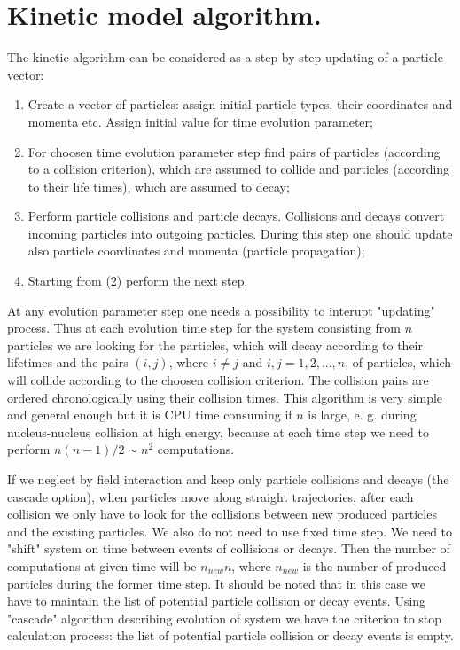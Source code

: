 \section{Kinetic model algorithm.}

 The kinetic algorithm can be considered as a step by step
updating of a particle vector:
\begin{enumerate}
\item Create a vector of particles: assign initial
particle types, their coordinates and momenta etc. Assign initial value
for time evolution parameter;
\item  For choosen time evolution parameter step find pairs of particles
(according to a collision criterion), which are assumed to collide and
particles (according to their life times), which are assumed to decay; 
\item  Perform particle collisions and particle decays. Collisions and
decays convert incoming particles  into outgoing particles. During this
step one should update also particle coordinates and momenta (particle 
propagation); 
\item Starting from (2) perform the next step.
\end{enumerate}

At any evolution parameter step one needs a possibility to interupt
"updating" process.
Thus at
 each evolution time step  for the system consisting
from $n$ particles we are looking for the particles, which will decay
according to their lifetimes and the pairs $(i,j)$, where $i\neq j$ and
$i,j = 1,2,...,n$, of particles, which will collide according to the
choosen collision criterion. The collision pairs are ordered
chronologically using their collision times.  This algorithm is very
simple and general enough but it is CPU time consuming if $n$ is large, 
e. g. during
nucleus-nucleus collision at high energy, because at each time step we
need to perform $n(n-1)/2 \sim n^2$ computations. 
 
If we neglect by field interaction and keep only particle collisions and 
decays (the cascade option), when
particles move along straight trajectories, after each collision we
only have to look for the collisions between new produced particles and
the existing particles. We also do not need to use fixed time step. We 
need to "shift" system on time between events of collisions or decays.
 Then the number of computations at given time 
will be $n_{new}n$, where $n_{new}$ is the number of produced particles
during the former time step. It should be noted that in this case we 
have to maintain
 the list of
potential particle collision or decay events.
Using "cascade" algorithm describing evolution of system we have the criterion 
to stop calculation process: the list of potential particle collision or 
decay events is empty.
